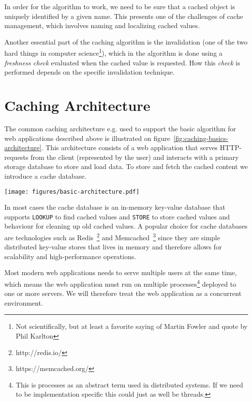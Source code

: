 In order for the algorithm to work, we need to be sure that a cached object is uniquely identified by a given name. This presents one of the challenges of cache management, which involves naming and localizing cached values.

Another essential part of the caching algorithm is the invalidation (one of the two hard things in computer science\footnote{Not scientifically, but at least a favorite saying of Martin Fowler and quote by Phil Karlton}), which in the algorithm is done using a \emph{freshness check} evaluated when the cached value is requested. How this \emph{check} is performed depends on the specific invalidation technique.

\section{Caching Architecture}
\label{subsec:architecture}

The common caching architecture e.g. used to support the basic algorithm for web applications described above is illustrated on figure~\ref{fig:caching-basics-architecture}. This architecture consists of a web application that serves HTTP-requests from the client (represented by the user) and interacts with a primary storage database to store and load data. To store and fetch the cached content we introduce a cache database.

\begin{figure*}[ht!]
  \centering
  \texttt{[image: figures/basic-architecture.pdf]}
  \caption{The assumed architecture of the system}
  \label{fig:caching-basics-architecture}
\end{figure*}

In most cases the cache database is an in-memory key-value database that supports \verb$LOOKUP$ to find cached values and \verb$STORE$ to store cached values and behaviour for cleaning up old cached values. A popular choice for cache databases are technologies such as Redis~\footnote{http://redis.io/} and Memcached~\footnote{https://memcached.org/} since they are simple distributed key-value stores that lives in memory and therefore allows for scalability and high-performance operations.

Most modern web applications needs to serve multiple users at the same time, which means the web application must run on multiple processes\footnote{This is processes as an abstract term used in distributed systems. If we need to be implementation specific this could just as well be threads.} deployed to one or more servers. We will therefore treat the web application as a concurrent environment.

